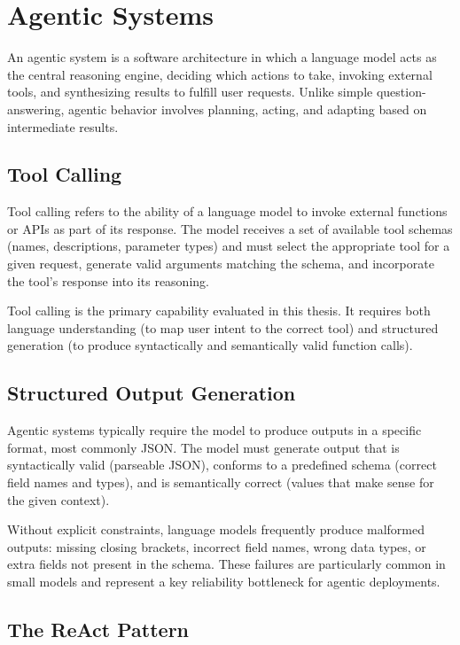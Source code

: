 \section{Agentic Systems}

An agentic system is a software architecture in which a language model acts as the central reasoning engine, deciding which actions to take, invoking external tools, and synthesizing results to fulfill user requests. Unlike simple question-answering, agentic behavior involves planning, acting, and adapting based on intermediate results.

\subsection{Tool Calling}

Tool calling refers to the ability of a language model to invoke external functions or APIs as part of its response. The model receives a set of available tool schemas (names, descriptions, parameter types) and must select the appropriate tool for a given request, generate valid arguments matching the schema, and incorporate the tool's response into its reasoning.

Tool calling is the primary capability evaluated in this thesis. It requires both language understanding (to map user intent to the correct tool) and structured generation (to produce syntactically and semantically valid function calls).

\subsection{Structured Output Generation}

Agentic systems typically require the model to produce outputs in a specific format, most commonly JSON. The model must generate output that is syntactically valid (parseable JSON), conforms to a predefined schema (correct field names and types), and is semantically correct (values that make sense for the given context).

Without explicit constraints, language models frequently produce malformed outputs: missing closing brackets, incorrect field names, wrong data types, or extra fields not present in the schema. These failures are particularly common in small models and represent a key reliability bottleneck for agentic deployments.

\subsection{The ReAct Pattern}


